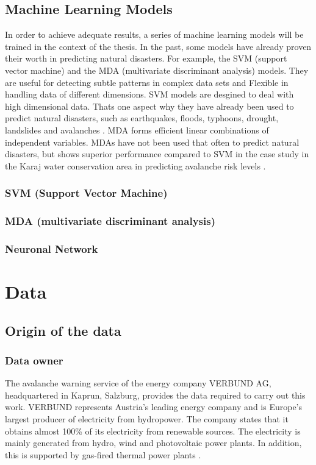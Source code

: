 \documentclass[12pt,a4paper]{article}
\begin{document}
\subsection{Machine Learning Models}
In order to achieve adequate results, a series of machine learning models will be trained in the context of the thesis. In the past, some models have already proven their worth in predicting natural disasters. For example, the SVM (support vector machine) and the MDA (multivariate discriminant analysis) models. They are useful for detecting subtle patterns in complex data sets and Flexible in handling data of different dimensions. SVM models are desgined to deal with high dimensional data. Thats one aspect why they have already been used to predict natural disasters, such as earthquakes, floods, typhoons, drought, landslides and avalanches \autocite{Bahram:2019} \autocite[]{Tiwari:2021} \autocite{Pozdnoukhov:2008}. MDA forms efficient linear combinations of independent variables. MDAs have not been used that often to predict natural disasters, but shows superior performance compared to SVM in the case study in the Karaj water conservation area in predicting avalanche risk levels \autocite[]{Tiwari:2021}.

\subsubsection{SVM (Support Vector Machine)}

\subsubsection{MDA (multivariate discriminant analysis)}

\subsubsection{Neuronal Network}








\section{Data}

\subsection{Origin of the data}

\subsubsection{Data owner}
The avalanche warning service of the energy company VERBUND AG, headquartered in Kaprun, Salzburg, provides the data required to carry out this work. VERBUND represents Austria's leading energy company and is Europe's largest producer of electricity from hydropower. The company states that it obtains almost 100\% of its electricity from renewable sources. The electricity is mainly generated from hydro, wind and photovoltaic power plants. In addition, this is supported by gas-fired thermal power plants \autocites{Verbund:2022}.
\end{document}
